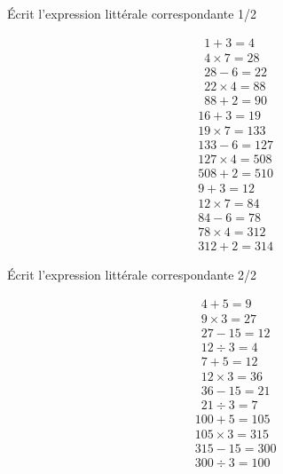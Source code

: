 \begin{frame}{Écrit l'expression littérale correspondante 1/2}
    \begin{multicols}{3}
        \noindent\begin{align*}
            &1+3=4\\
            &4\times7=28\\
            &28-6=22\\
            &22\times4=88\\
            &88+2=90
        \end{align*}
        \begin{align*}
            &16+3=19\\
            &19\times7=133\\
            &133-6=127\\
            &127\times4=508\\
            &508+2=510
        \end{align*}
        \begin{align*}
            &9+3=12\\
            &12\times7=84\\
            &84-6=78\\
            &78\times4=312\\
            &312+2=314
        \end{align*}
    \end{multicols}
\end{frame}

\begin{frame}{Écrit l'expression littérale correspondante 2/2}
    \begin{multicols}{3}
        \noindent\begin{align*}
            &4+5=9\\
            &9\times3=27\\
            &27-15=12\\
            &12\div3=4
        \end{align*}
        \begin{align*}
            &7+5=12\\
            &12\times3=36\\
            &36-15=21\\
            &21\div3=7
        \end{align*}
        \begin{align*}
            &100+5=105\\
            &105\times3=315\\
            &315-15=300\\
            &300\div3=100
        \end{align*}
    \end{multicols}
\end{frame}